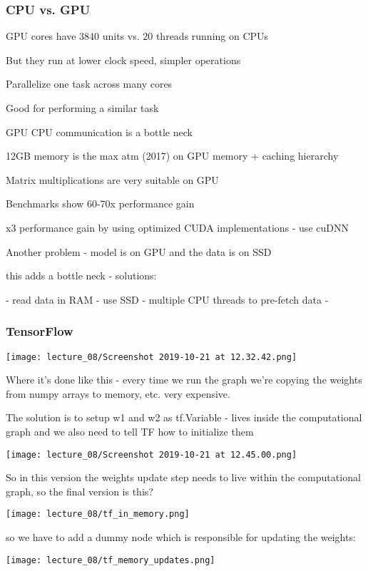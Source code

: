\subsubsection{CPU vs. GPU}

GPU cores have 3840 units vs. 20 threads running on CPUs 

But they run at lower clock speed, simpler operations

Parallelize one task across many cores

Good for performing a similar task

GPU CPU communication is a bottle neck

12GB memory is the max atm (2017) on GPU memory + caching hierarchy

Matrix multiplications are very suitable on GPU

Benchmarks show 60-70x performance gain

x3 performance gain by using optimized CUDA implementations - use cuDNN

Another problem - model is on GPU and the data is on SSD

this adds a bottle neck - solutions:

	- read data in RAM
	- use SSD
	- multiple CPU threads to pre-fetch data
	- 

\subsubsection{TensorFlow}

\texttt{[image: lecture\_08/Screenshot 2019-10-21 at 12.32.42.png]}

Where it's done like this - every time we run the graph we're copying the weights from numpy arrays to memory, etc. very expensive.

The solution is to setup w1 and w2 as tf.Variable - lives inside the computational graph and we also need to tell TF how to initialize them

\texttt{[image: lecture\_08/Screenshot 2019-10-21 at 12.45.00.png]}

So in this version the weights update step needs to live within the computational graph, so the final version is this? 

\texttt{[image: lecture\_08/tf\_in\_memory.png]}

so we have to add a dummy node which is responsible for updating the weights:

\texttt{[image: lecture\_08/tf\_memory\_updates.png]}

